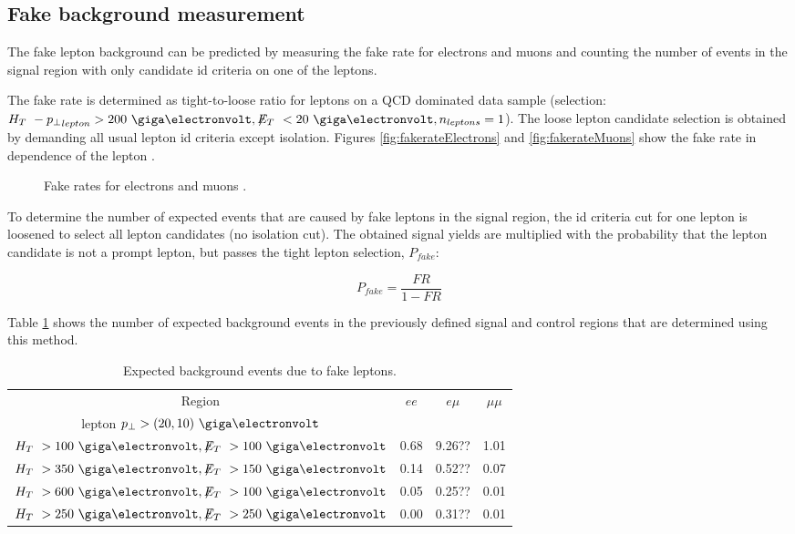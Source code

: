 \subsection{Fake background measurement}\label{sec:fakes}

The fake lepton background can be predicted by measuring the fake rate for electrons and muons and counting the number of events in the signal region with only candidate id criteria on one of the leptons.

The fake rate is determined as tight-to-loose ratio for leptons on a QCD dominated data sample (selection: $\HT - {\pT}_{lepton} > 200~\GeV, \MET < 20~\GeV, n_{leptons} = 1$). The loose lepton candidate selection is obtained by demanding all usual lepton id criteria except isolation. Figures \ref{fig:fakerateElectrons} and \ref{fig:fakerateMuons} show the fake rate in dependence of the lepton \pT.


\begin{figure}[hbtp]
  \hfill
  \hfill
  \caption{Fake rates for electrons  and muons .}
\end{figure}

To determine the number of expected events that are caused by fake leptons in the signal region, the id criteria cut for one lepton is loosened to select all lepton candidates (no isolation cut). The obtained signal yields are multiplied with the probability that the lepton candidate is not a prompt lepton, but passes the tight lepton selection, $P_{fake}$:

$$P_{fake} = \frac{FR}{1- FR}$$

Table \ref{tab:fakeYields} shows the number of expected background events in the previously defined signal and control regions that are determined using this method.

\begin{table}[hbtp]
\caption{Expected background events due to fake leptons.}
\label{tab:fakeYields}
\begin{center}
\begin{tabular}{c||c|c|c} \hline
Region   & $ee$ & $e\mu$ &  $\mu\mu$  \\
lepton $\pT > (20, 10)~\GeV$  & & & \\\hline \hline
$\HT > 100~\GeV, \MET > 100~\GeV$ &  0.68  & 9.26?? & 1.01 \\
$\HT > 350~\GeV, \MET > 150~\GeV$ &  0.14  & 0.52?? & 0.07 \\
$\HT > 600~\GeV, \MET > 100~\GeV$ &  0.05  & 0.25?? & 0.01 \\
$\HT > 250~\GeV, \MET > 250~\GeV$ &  0.00  & 0.31?? & 0.01 \\\hline
\end{tabular}
\end{center}
\end{table}
